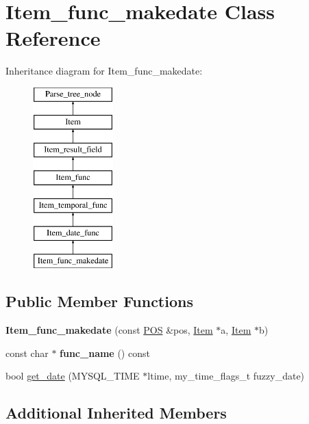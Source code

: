 \hypertarget{classItem__func__makedate}{}\section{Item\+\_\+func\+\_\+makedate Class Reference}
\label{classItem__func__makedate}
Inheritance diagram for Item\+\_\+func\+\_\+makedate\+:\begin{figure}[H]
\begin{center}
\leavevmode
\includegraphics[height=7.000000cm]{classItem__func__makedate}
\end{center}
\end{figure}
\subsection*{Public Member Functions}
\begin{DoxyCompactItemize}
\item 
\mbox{\label{classItem__func__makedate_a9af73eec78c84b85fcb765659de39868}} 
{\bfseries Item\+\_\+func\+\_\+makedate} (const \mbox{\hyperlink{structYYLTYPE}{P\+OS}} \&pos, \mbox{\hyperlink{classItem}{Item}} $\ast$a, \mbox{\hyperlink{classItem}{Item}} $\ast$b)
\item 
\mbox{\label{classItem__func__makedate_a4c49545818cf4453a8fe5e01e840d3df}} 
const char $\ast$ {\bfseries func\+\_\+name} () const
\item 
bool \mbox{\hyperlink{classItem__func__makedate_a5cf64b7ab373a5ae48f1338e6fffd00f}{get\+\_\+date}} (M\+Y\+S\+Q\+L\+\_\+\+T\+I\+ME $\ast$ltime, my\+\_\+time\+\_\+flags\+\_\+t fuzzy\+\_\+date)
\end{DoxyCompactItemize}
\subsection*{Additional Inherited Members}



